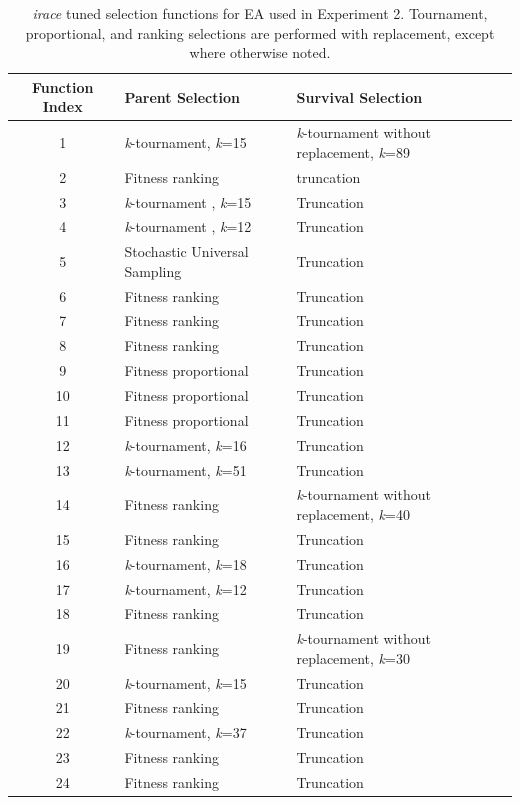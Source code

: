 \documentclass[sigconf]{acmart}
\begin{document}
\begin{table}
	\centering
	\caption{\textit{irace} tuned selection functions for EA used in Experiment 2. Tournament, proportional, and ranking selections are performed with replacement, except where otherwise noted.}
	\label{tab:iRaceBasicEASelection}
	\begin{tabular}{cp{5cm}p{5cm}}
		\toprule
		Function Index & Parent Selection & Survival Selection \\
		\midrule
		1 & \textit{k}-tournament, \textit{k}=15 & \textit{k}-tournament without replacement, \textit{k}=89  \\ 
		\hline
		2 & Fitness ranking & truncation\\
		\hline
		3 & \textit{k}-tournament , \textit{k}=15 & Truncation \\ 
		\hline
		4 & \textit{k}-tournament , \textit{k}=12 & Truncation \\ 
		\hline
		5 & Stochastic Universal Sampling & Truncation\\
		\hline
		6 & Fitness ranking & Truncation  \\ 
		\hline
		7 & Fitness ranking & Truncation   \\ 
		\hline
		8 & Fitness ranking & Truncation   \\ 
		\hline
		9 & Fitness proportional & Truncation   \\ 
		\hline
		10 & Fitness proportional & Truncation   \\ 
		\hline
		11 & Fitness proportional & Truncation   \\   
		\hline
		12 & \textit{k}-tournament, \textit{k}=16 & Truncation   \\ 
		\hline
		13 & \textit{k}-tournament, \textit{k}=51 & Truncation    \\ 
		\hline
		14 & Fitness ranking & \textit{k}-tournament without replacement, \textit{k}=40   \\ 
		\hline
		15 & Fitness ranking & Truncation   \\ 
		\hline
		16 &  \textit{k}-tournament, \textit{k}=18 & Truncation  \\ 
		\hline
		17 &  \textit{k}-tournament, \textit{k}=12 & Truncation  \\ 
		\hline
		18 &  Fitness ranking & Truncation  \\ 
		\hline
		19 &  Fitness ranking & \textit{k}-tournament without replacement, \textit{k}=30  \\ 
		\hline
		20 &  \textit{k}-tournament, \textit{k}=15 & Truncation   \\ 
		\hline
		21 &  Fitness ranking & Truncation  \\ 
		\hline
		22 &  \textit{k}-tournament, \textit{k}=37 & Truncation  \\ 
		\hline
		23 &  Fitness ranking & Truncation  \\ 
		\hline
		24 &  Fitness ranking & Truncation  \\ 
		
		\bottomrule      
	\end{tabular}
\end{table}
\end{document}
